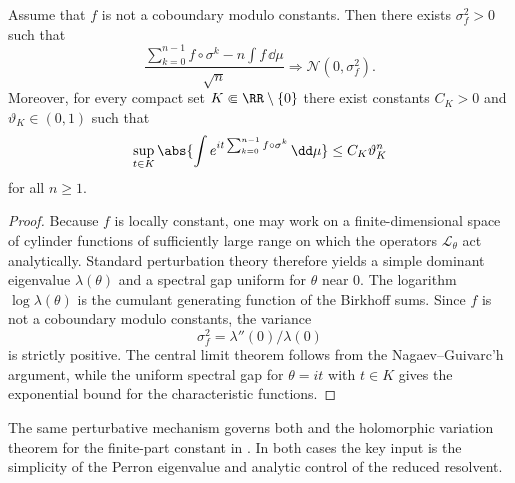 \begin{theorem}
  \label{thm:clt-spectral}
  Assume that $f$ is not a coboundary modulo constants. Then there
  exists $\sigma_f^2>0$ such that
  \[
    \frac{\sum_{k=0}^{n-1}f\circ\sigma^k
      -n\int f\,\dd\mu}{\sqrt n}
    \Longrightarrow \mathcal N(0,\sigma_f^2).
  \]
  Moreover, for every compact set $K\Subset\RR\setminus\{0\}$ there
  exist constants $C_K>0$ and $\vartheta_K\in(0,1)$ such that
  \[
    \sup_{t\in K}
    \abs{\int e^{it\sum_{k=0}^{n-1}f\circ\sigma^k}\,\dd\mu}
    \le C_K\vartheta_K^n
  \]
  for all $n\ge 1$.
\end{theorem}

\begin{proof}
  Because $f$ is locally constant, one may work on a
  finite-dimensional space of cylinder functions of sufficiently large
  range on which the operators $\mathcal L_\theta$ act analytically.
  Standard perturbation theory therefore yields a simple dominant
  eigenvalue $\lambda(\theta)$ and a spectral gap uniform for $\theta$
  near $0$. The logarithm
  $\log\lambda(\theta)$ is the cumulant generating function of the
  Birkhoff sums. Since $f$ is not a coboundary modulo constants, the
  variance
  \[
    \sigma_f^2=\lambda''(0)/\lambda(0)
  \]
  is strictly positive. The central limit theorem follows from the
  Nagaev--Guivarc'h argument, while the uniform spectral gap for
  $\theta=it$ with $t\in K$ gives the exponential bound for the
  characteristic functions.
\end{proof}

\begin{remark}
  The same perturbative mechanism governs both
   and the holomorphic variation theorem for the
  finite-part constant in . In
  both cases the key input is the simplicity of the Perron eigenvalue
  and analytic control of the reduced resolvent.
\end{remark}
